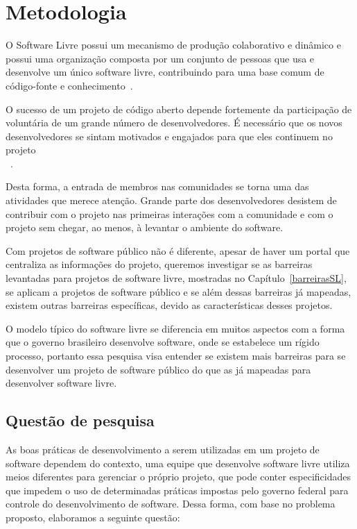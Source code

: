 \chapter{Metodologia}
\label{metodologia}

O Software Livre possui um mecanismo de produção colaborativo e dinâmico 
e possui uma organização composta por um conjunto de pessoas que usa e desenvolve 
um único software livre, contribuindo para uma base comum de código-fonte e 
conhecimento~\cite{reis2003caracterizacc}.

O sucesso de um projeto de código aberto depende fortemente da participação de 
voluntária de um grande número de desenvolvedores. É necessário que os novos 
desenvolvedores se sintam motivados e engajados para que eles continuem no 
projeto\\~\cite{qureshi2010socialization}.

Desta forma, a entrada de membros nas comunidades se torna uma das atividades que
merece atenção. Grande parte dos desenvolvedores desistem de contribuir com o 
projeto nas primeiras interações com a comunidade e com o projeto sem chegar,
ao menos, à levantar o ambiente do software.

Com projetos de software público não é diferente, apesar de haver um portal que
centraliza as informações do projeto, queremos investigar se as barreiras levantadas
para projetos de software livre, mostradas no Capítulo~\ref{barreirasSL}, se aplicam
a projetos de software público e se além dessas barreiras já mapeadas, existem outras 
barreiras específicas, devido as características desses projetos.

O modelo típico do software livre se diferencia em muitos aspectos 
com a forma que o governo brasileiro desenvolve software, onde se estabelece um 
rígido processo, portanto essa pesquisa visa entender se existem mais barreiras 
para se desenvolver um projeto de software público do que as já mapeadas para 
desenvolver software livre.



\section{Questão de pesquisa}

As boas práticas de desenvolvimento a serem utilizadas em um projeto de software 
dependem do contexto, uma equipe que desenvolve software livre utiliza
meios diferentes para gerenciar o próprio projeto, que pode conter especificidades 
que impedem o uso de determinadas práticas impostas pelo governo federal para controle
do desenvolvimento de software. 
Dessa forma, com base no problema proposto, elaboramos a seguinte questão:


